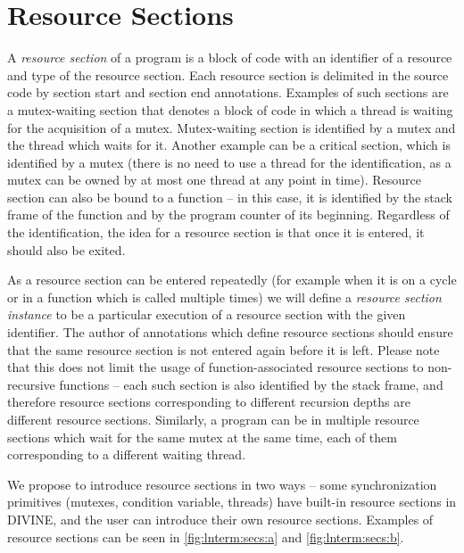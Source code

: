 \section{Resource Sections}

A \emph{resource section} of a program is a block of code with an identifier of a resource and type of the resource section.
Each resource section is delimited in the source code by section start and section end annotations.
Examples of such sections are a mutex-waiting section that denotes a block of code in which a thread is waiting for the acquisition of a mutex.
Mutex-waiting section is identified by a mutex and the thread which waits for it.
Another example can be a critical section, which is identified by a mutex (there is no need to use a thread for the identification, as a mutex can be owned by at most one thread at any point in time).
Resource section can also be bound to a function -- in this case, it is identified by the stack frame of the function and by the program counter of its beginning.
Regardless of the identification, the idea for a resource section is that once it is entered, it should also be exited.

As a resource section can be entered repeatedly (for example when it is on a cycle or in a function which is called multiple times) we will define a \emph{resource section instance} to be a particular execution of a resource section with the given identifier.
The author of annotations which define resource sections should ensure that the same resource section is not entered again before it is left.
Please note that this does not limit the usage of function-associated resource sections to non-recursive functions -- each such section is also identified by the stack frame, and therefore resource sections corresponding to different recursion depths are different resource sections.
Similarly, a program can be in multiple resource sections which wait for the same mutex at the same time, each of them corresponding to a different waiting thread.

We propose to introduce resource sections in two ways -- some synchronization primitives (mutexes, condition variable, threads) have built-in resource sections in DIVINE, and the user can introduce their own resource sections.
Examples of resource sections can be seen in \autoref{fig:lnterm:secs:a} and \autoref{fig:lnterm:secs:b}.

